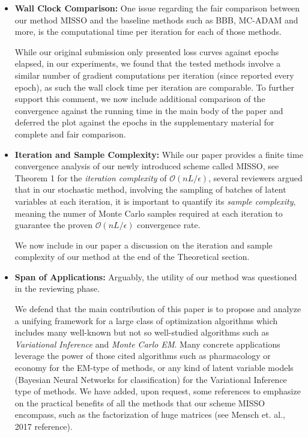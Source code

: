 \documentclass{article}
\begin{document}
\begin{itemize}
\item \textbf{Wall Clock Comparison: } One issue regarding the fair comparison between our method MISSO and the baseline methods such as BBB, MC-ADAM and more, is the computational time per iteration for each of those methods.  

While our original submission only presented loss curves against epochs elapsed, in our experiments, we found that the tested methods involve a similar number of gradient computations per iteration (since reported every epoch), as such the wall clock time per iteration are comparable. 
To further support this comment, we now include additional comparison of the convergence against the running time in the main body of the paper and deferred the plot against the epochs in the supplementary material for complete and fair comparison.

\item \textbf{Iteration and Sample Complexity: } While our paper provides a finite time convergence analysis of our newly introduced scheme called MISSO, see Theorem 1 for the \emph{iteration complexity} of $\mathcal{O}(nL/\epsilon)$, several reviewers argued that in our stochastic method, involving the sampling of batches of latent variables at each iteration, it is important to quantify its \emph{sample complexity}, meaning the numer of Monte Carlo samples required at each iteration to guarantee the proven $\mathcal{O}(nL/\epsilon)$ convergence rate. 

We now include in our paper a discussion on the iteration and sample complexity of our method at the end of the Theoretical section.

\item \textbf{Span of Applications: } Arguably, the utility of our method was questioned in the reviewing phase. 

We defend that the main contribution of this paper is to propose and analyze a unifying framework for a large class of optimization algorithms which includes many well-known but not so well-studied algorithms such as \emph{Variational Inference} and \emph{Monte Carlo EM}. Many concrete applications leverage the power of those cited algorithms such as pharmacology or economy for the EM-type of methods, or any kind of latent variable models (Bayesian Neural Networks for classification) for the Variational Inference type of methods.
We have added, upon request, some references to emphasize on the practical benefits of all the methods that our scheme MISSO encompass, such as the factorization of huge matrices (see Mensch et. al., 2017 reference).

\end{itemize}

%
%
%
\end{document}
